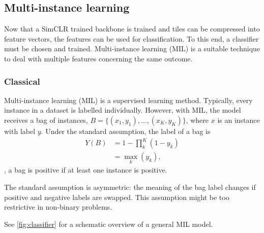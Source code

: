 \subsection{Multi-instance learning}

Now that a SimCLR trained backbone is trained and tiles can be compressed into feature vectors, the features can be used for classification.
To this end, a classifier must be chosen and trained.
Multi-instance learning (MIL) is a suitable technique to deal with multiple features concerning the same outcome.

\subsubsection{Classical}
Multi-instance learning (MIL) is a supervised learning method.
Typically, every instance in a dataset is labelled individually.
However, with MIL, the model receives a bag of instances, $B=\{(x_1,y_1),\ldots,(x_K,y_K)\}$, where $x$ is an instance with label $y$.
Under the standard assumption, the label of a bag is
\begin{align}
    Y(B) &= 1 - \prod_{k}^{K}(1-y_k) \\
         &= \max_k(y_k),
\end{align}
\ie, a bag is positive if at least one instance is positive.

The standard assumption is asymmetric: the meaning of the bag label changes if positive and negative labels are swapped.
This assumption might be too restrictive in non-binary problems.

See \cref{fig:classifier} for a schematic overview of a general MIL model.

\begin{figure*}
    \centering
    
    \caption[Multi-instance learning classification]{
        Extracted features (tile features in this work) are presented to a multi-layer perceptron (MLP) with learnable weights.
        The first MLP outputs an aggregate that summarizes all input features.
        The aggregate is used as input to a classifier MLP with learnable weights that outputs a prediction.
        Weights are updated based on pre-defined loss between prediction and target.
    }
    \label{fig:classifier}
\end{figure*}

